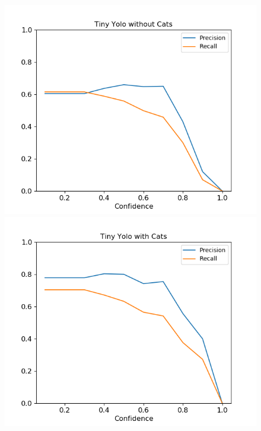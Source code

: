 \documentclass{article}
\begin{document}
\begin{figure}
	\centering
	\begin{minipage}{0.4\textwidth}
		\includegraphics[width=\textwidth]{fig/pr_tiny}
	\end{minipage}
	\begin{minipage}{0.4\textwidth}
		\includegraphics[width=\textwidth]{fig/pr_tiny_cats}
	\end{minipage}
	\begin{minipage}{0.4\textwidth}

\end{minipage}
\end{figure}
\end{document}
